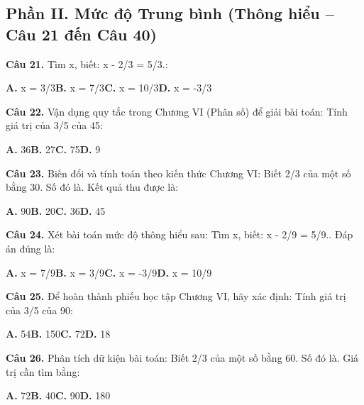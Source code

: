 \documentclass[11pt,a4paper]{article}
\begin{document}
\subsection*{\color{accent} Phần II. Mức độ Trung bình (Thông hiểu -- Câu 21 đến Câu 40)}
\textbf{\color{primary} Câu 21.} Tìm x, biết: x - 2/3 = 5/3.:\par
\hspace*{1.5em}\textbf{A.} x = 3/3\quad\quad \textbf{B.} x = 7/3\quad\quad \textbf{C.} x = 10/3\quad\quad \textbf{D.} x = -3/3\par\vspace{2pt}
\textbf{\color{primary} Câu 22.} Vận dụng quy tắc trong Chương VI (Phân số) để giải bài toán: Tính giá trị của 3/5 của 45:\par
\hspace*{1.5em}\textbf{A.} 36\quad\quad \textbf{B.} 27\quad\quad \textbf{C.} 75\quad\quad \textbf{D.} 9\par\vspace{2pt}
\textbf{\color{primary} Câu 23.} Biến đổi và tính toán theo kiến thức Chương VI: Biết 2/3 của một số bằng 30. Số đó là. Kết quả thu được là:\par
\hspace*{1.5em}\textbf{A.} 90\quad\quad \textbf{B.} 20\quad\quad \textbf{C.} 36\quad\quad \textbf{D.} 45\par\vspace{2pt}
\textbf{\color{primary} Câu 24.} Xét bài toán mức độ thông hiểu sau: Tìm x, biết: x - 2/9 = 5/9.. Đáp án đúng là:\par
\hspace*{1.5em}\textbf{A.} x = 7/9\quad\quad \textbf{B.} x = 3/9\quad\quad \textbf{C.} x = -3/9\quad\quad \textbf{D.} x = 10/9\par\vspace{2pt}
\textbf{\color{primary} Câu 25.} Để hoàn thành phiếu học tập Chương VI, hãy xác định: Tính giá trị của 3/5 của 90:\par
\hspace*{1.5em}\textbf{A.} 54\quad\quad \textbf{B.} 150\quad\quad \textbf{C.} 72\quad\quad \textbf{D.} 18\par\vspace{2pt}
\textbf{\color{primary} Câu 26.} Phân tích dữ kiện bài toán: Biết 2/3 của một số bằng 60. Số đó là. Giá trị cần tìm bằng:\par
\hspace*{1.5em}\textbf{A.} 72\quad\quad \textbf{B.} 40\quad\quad \textbf{C.} 90\quad\quad \textbf{D.} 180\par\vspace{2pt}
\end{document}
